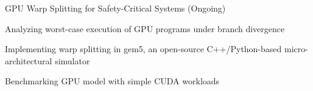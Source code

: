 

\begin{cvprojects}

  \cvproject
    {GPU Warp Splitting for Safety-Critical Systems (Ongoing)} %
    {
      \begin{cvitems} %
        \item {Analyzing worst-case execution of GPU programs under branch divergence}
        \item {Implementing warp splitting in gem5, an open-source C++/Python-based micro-architectural simulator}
        \item {Benchmarking GPU model with simple CUDA workloads}
      \end{cvitems}
    }
    

\end{cvprojects}
